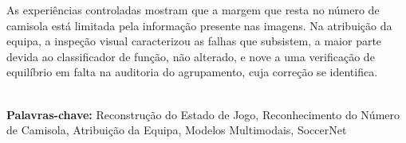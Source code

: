 As experiências controladas mostram que a margem que resta no número de camisola está limitada pela
informação presente nas imagens. Na atribuição da equipa, a inspeção visual caracterizou as falhas
que subsistem, a maior parte devida ao classificador de função, não alterado, e nove a uma
verificação de equilíbrio em falta na auditoria do agrupamento, cuja correção se identifica.

\hspace{3cm}\\
\indent
\textbf{Palavras-chave: } Reconstrução do Estado de Jogo, Reconhecimento do Número de Camisola,
Atribuição da Equipa, Modelos Multimodais, SoccerNet